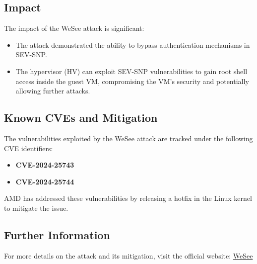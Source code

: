 \subsection{Impact}
The impact of the WeSee attack is significant:
\begin{itemize}
    \item The attack demonstrated the ability to bypass authentication mechanisms in SEV-SNP.
    \item The hypervisor (HV) can exploit SEV-SNP vulnerabilities to gain root shell access inside the guest VM, compromising the VM's security and potentially allowing further attacks.
\end{itemize}

\subsection{Known CVEs and Mitigation}
The vulnerabilities exploited by the WeSee attack are tracked under the following CVE identifiers:
\begin{itemize}
    \item \textbf{CVE-2024-25743}
    \item \textbf{CVE-2024-25744}
\end{itemize}
AMD has addressed these vulnerabilities by releasing a hotfix in the Linux kernel to mitigate the issue.

\subsection{Further Information}
For more details on the attack and its mitigation, visit the official website: \href{https://ahoi-attacks.github.io/wesee/}{WeSee}

